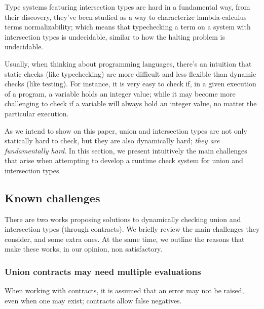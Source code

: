 \newcommand{\moral}[1]{\noindent $\hookrightarrow$ \textsc{#1}}

Type systems featuring intersection types are hard in a fundamental way,
from their discovery, they've been studied as a way to characterize
lambda-calculus terms normalizability; which means that typechecking a
term on a system with intersection types is undecidable,
similar to how the halting problem is undecidable.

Usually, when thinking about programming languages, there's an intuition
that static checks (like typechecking) are more difficult and less flexible
than dynamic checks (like testing). For instance, it is very easy to check if,
in a given execution of a program, a variable holds an integer value; while it
may become more challenging to check if a variable will always hold an integer value,
no matter the particular execution.

As we intend to show on this paper, union and intersection types are not only
statically hard to check, but they are also dynamically hard;
\emph{they are fundamentally hard}.
In this section, we present intuitively the main challenges that arise
when attempting to develop a runtime check system for union and intersection types.

\subsection{Known challenges}

There are two works proposing solutions to dynamically checking union and intersection
types (through contracts). 
We briefly review the main challenges they consider, and some extra ones.
At the same time, we outline the reasons that make these works,
in our opinion, non satisfactory.


\subsubsection*{Union contracts may need multiple evaluations}

When working with contracts, it is assumed that an error may not be raised, even
when one may exist; contracts allow false negatives.


